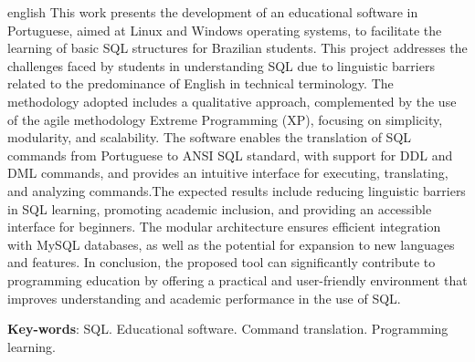 \begin{resumo}[Abstract]
  \begin{otherlanguage*}{english}
    This work presents the development of an educational software in Portuguese, aimed at Linux and Windows operating systems, to facilitate the learning of basic SQL structures for Brazilian students. This project addresses the challenges faced by students in understanding SQL due to linguistic barriers related to the predominance of English in technical terminology. The methodology adopted includes a qualitative approach, complemented by the use of the agile methodology Extreme Programming (XP), focusing on simplicity, modularity, and scalability. The software enables the translation of SQL commands from Portuguese to ANSI SQL standard, with support for DDL and DML commands, and provides an intuitive interface for executing, translating, and analyzing commands.The expected results include reducing linguistic barriers in SQL learning, promoting academic inclusion, and providing an accessible interface for beginners. The modular architecture ensures efficient integration with MySQL databases, as well as the potential for expansion to new languages and features. In conclusion, the proposed tool can significantly contribute to programming education by offering a practical and user-friendly environment that improves understanding and academic performance in the use of SQL.
    
    \vspace{\onelineskip}
  
    \noindent 
    \textbf{Key-words}: SQL. Educational software. Command translation. Programming learning.
  \end{otherlanguage*}
 \end{resumo}
 